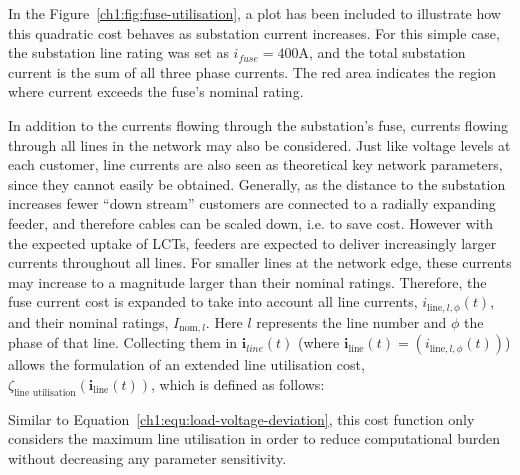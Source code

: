 

In the Figure~\ref{ch1:fig:fuse-utilisation}, a plot has been included to illustrate how this quadratic cost behaves as substation current increases.
For this simple case, the substation line rating was set as $i_{fuse}=400\text{A}$, and the total substation current is the sum of all three phase currents.
The red area indicates the region where current exceeds the fuse's nominal rating.




In addition to the currents flowing through the substation's fuse, currents flowing through all lines in the network may also be considered.
Just like voltage levels at each customer, line currents are also seen as theoretical key network parameters, since they cannot easily be obtained.
Generally, as the distance to the substation increases fewer ``down stream'' customers are connected to a radially expanding feeder, and therefore cables can be scaled down, i.e. to save cost.
However with the expected uptake of LCTs, feeders are expected to deliver increasingly larger currents throughout all lines.
For smaller lines at the network edge, these currents may increase to a magnitude larger than their nominal ratings.
Therefore, the fuse current cost is expanded to take into account all line currents, $i_{\text{line},l,\phi}(t)$, and their nominal ratings, $I_{\text{nom}, l}$.
Here $l$ represents the line number and $\phi$ the phase of that line.
Collecting them in $\textbf{i}_{line}(t)$ (where $\textbf{i}_\text{line}(t) = (i_{\text{line},l,\phi}(t))$) allows the formulation of an extended line utilisation cost, $\zeta_\text{line utilisation}(\textbf{i}_\text{line}(t))$, which is defined as follows:



Similar to Equation~\ref{ch1:equ:load-voltage-deviation}, this cost function only considers the maximum line utilisation in order to reduce computational burden without decreasing any parameter sensitivity.
